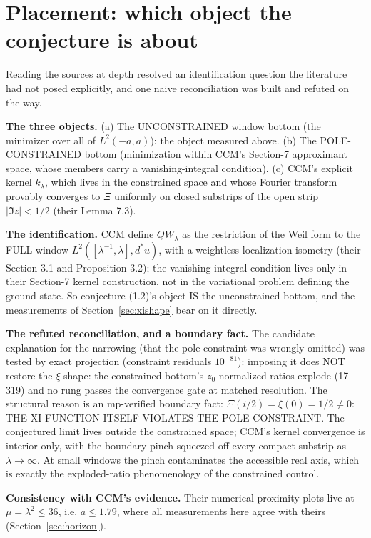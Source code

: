\documentclass[10pt]{article}
\begin{document}
\section{Placement: which object the conjecture is about}\label{sec:placement}

Reading the sources at depth resolved an identification question the literature had not posed explicitly, and one naive reconciliation was built and refuted on the way.

\textbf{The three objects.} (a) The UNCONSTRAINED window bottom (the minimizer over all of $L^2(-a,a)$): the object measured above. (b) The POLE-CONSTRAINED bottom (minimization within CCM's Section-7 approximant space, whose members carry a vanishing-integral condition). (c) CCM's explicit kernel $k_\lambda$, which lives in the constrained space and whose Fourier transform provably converges to $\Xi$ uniformly on closed substrips of the open strip $|\Im z| < 1/2$ (their Lemma 7.3).

\textbf{The identification.} CCM define $QW_\lambda$ as the restriction of the Weil form to the FULL window $L^2([\lambda^{-1},\lambda], d^*u)$, with a weightless localization isometry (their Section 3.1 and Proposition 3.2); the vanishing-integral condition lives only in their Section-7 kernel construction, not in the variational problem defining the ground state. So conjecture (1.2)'s object IS the unconstrained bottom, and the measurements of Section~\ref{sec:xishape} bear on it directly.

\textbf{The refuted reconciliation, and a boundary fact.} The candidate explanation for the narrowing (that the pole constraint was wrongly omitted) was tested by exact projection (constraint residuals $10^{-81}$): imposing it does NOT restore the $\xi$ shape: the constrained bottom's $z_0$-normalized ratios explode (17-319) and no rung passes the convergence gate at matched resolution. The structural reason is an mp-verified boundary fact: $\Xi(i/2) = \xi(0) = 1/2 \neq 0$: THE XI FUNCTION ITSELF VIOLATES THE POLE CONSTRAINT. The conjectured limit lives outside the constrained space; CCM's kernel convergence is interior-only, with the boundary pinch squeezed off every compact substrip as $\lambda \to \infty$. At small windows the pinch contaminates the accessible real axis, which is exactly the exploded-ratio phenomenology of the constrained control.

\textbf{Consistency with CCM's evidence.} Their numerical proximity plots live at $\mu = \lambda^2 \le 36$, i.e. $a \le 1.79$, where all measurements here agree with theirs (Section~\ref{sec:horizon}).
\end{document}
